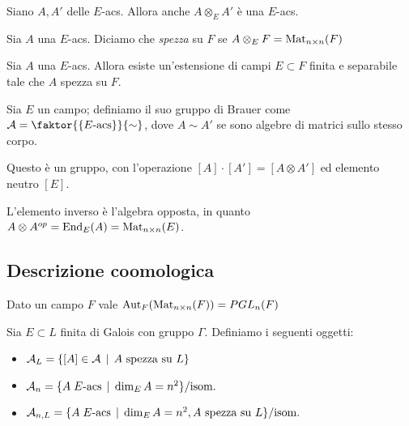 \begin{theorem}
    Siano $A,A'$ delle $E$-acs. Allora anche $A\otimes_E A'$ è una $E$-acs.
\end{theorem}

\begin{definition}
    Sia $A$ una $E$-acs. Diciamo che \emph{spezza} su $F$ se $A\otimes_E F=\operatorname{Mat}_{n\times n}(F)$
\end{definition}

\begin{theorem}
    Sia $A$ una $E$-acs. Allora esiste un'estensione di campi $E\subset F$ finita e separabile tale che $A$ spezza su $F$.
\end{theorem}


\begin{definition}
    Sia $E$ un campo; definiamo il suo gruppo di Brauer come $\mathcal A=\faktor{ \{ E\text{-acs} \} }{\sim}$, dove $A\sim A'$ se sono algebre di matrici sullo stesso corpo.
    
    Questo è un gruppo, con l'operazione $[A]\cdot [A']=[A\otimes A']$ ed elemento neutro $[E]$.
\end{definition}

\begin{oss}
    L'elemento inverso è l'algebra opposta, in quanto $A\otimes A^{op}=\operatorname{End}_E(A)=\operatorname{Mat}_{n\times n}(E)$.
\end{oss}

\subsection{Descrizione coomologica}

\begin{lemma}
    Dato un campo $F$ vale $\operatorname{Aut}_F(\operatorname{Mat}_{n\times n}(F))=PGL_n(F)$
\end{lemma}

\begin{definition}
    Sia $E\subset L$ finita di Galois con gruppo $\Gamma$. Definiamo i seguenti oggetti:
    \begin{itemize}
        \item $\mathcal A_L=\{ [A]\in\mathcal A \operatorname{\; |\;} A\text{ spezza su } L \}$
        \item $\mathcal A_n=\{ A\; E\text{-acs} \operatorname{\; |\;} \dim_E A=n^2 \}/\text{isom.}$
        \item $\mathcal A_{n,L}= \{ A\; E\text{-acs} \operatorname{\; |\;} \dim_E A=n^2, A\text{ spezza su } L  \}/\text{isom.}$
    \end{itemize}
\end{definition}

